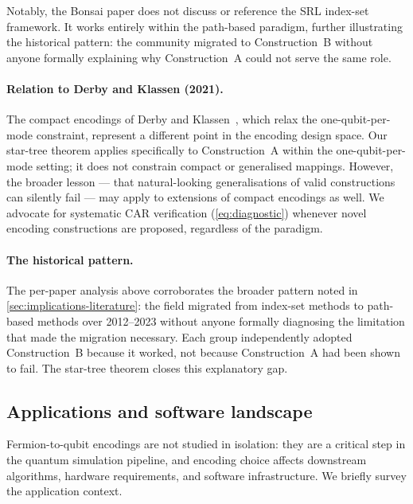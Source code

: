 Notably, the Bonsai paper does not discuss or reference the SRL
index-set framework.  It works entirely within the path-based
paradigm, further illustrating the historical pattern: the community
migrated to Construction~B without anyone formally explaining why
Construction~A could not serve the same role.

\paragraph{Relation to Derby and Klassen (2021).}
The compact encodings of Derby and Klassen~\cite{derby2021}, which
relax the one-qubit-per-mode constraint, represent a different point
in the encoding design space.  Our star-tree theorem applies
specifically to Construction~A within the one-qubit-per-mode setting;
it does not constrain compact or generalised mappings.  However, the
broader lesson --- that natural-looking generalisations of valid
constructions can silently fail --- may apply to extensions of compact
encodings as well.  We advocate for systematic CAR verification
(\cref{eq:diagnostic}) whenever novel encoding constructions are proposed,
regardless of the paradigm.

\paragraph{The historical pattern.}
The per-paper analysis above corroborates the broader pattern noted
in \cref{sec:implications-literature}: the field migrated from
index-set methods to path-based methods over 2012--2023 without
anyone formally diagnosing the limitation that made the migration
necessary.  Each group independently adopted Construction~B because
it worked, not because Construction~A had been shown to fail.
The star-tree theorem closes this explanatory gap.

\subsection{Applications and software landscape}
\label{sec:applications}

Fermion-to-qubit encodings are not studied in isolation: they are a
critical step in the quantum simulation pipeline, and encoding choice
affects downstream algorithms, hardware requirements, and software
infrastructure.  We briefly survey the application context.

